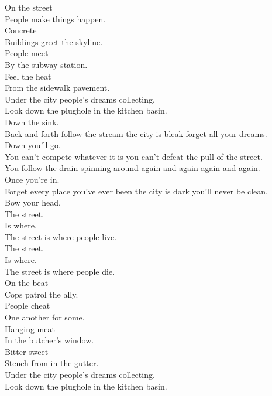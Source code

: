 


On the street \\
People make things happen. \\
Concrete \\
Buildings greet the skyline. \\
People meet \\
By the subway station. \\
Feel the heat \\
From the sidewalk pavement. \\
Under the city people's dreams collecting. \\
Look down the plughole in the kitchen basin. \\

Down the sink. \\
Back and forth follow the stream the city is bleak forget all your dreams. \\
Down you'll go. \\
You can't compete whatever it is you can't defeat the pull of the street. \\
You follow the drain spinning around again and again again and again. \\
Once you're in. \\
Forget every place you've ever been the city is dark you'll never be clean. \\
Bow your head. \\

The street. \\
Is where. \\
The street is where people live. \\
The street. \\
Is where. \\
The street is where people die. \\

On the beat \\
Cops patrol the ally. \\
People cheat \\
One another for some. \\
Hanging meat \\
In the butcher's window. \\
Bitter sweet \\
Stench from in the gutter. \\
Under the city people's dreams collecting. \\
Look down the plughole in the kitchen basin. \\

